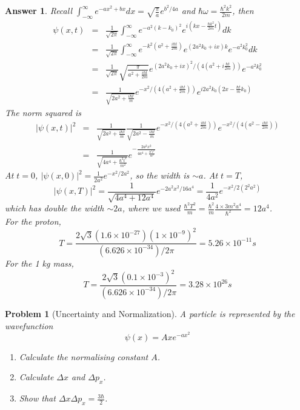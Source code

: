 \documentclass[a4paper]{article}
\newtheorem{ans}{Answer}[section]
\theoremstyle{new}
\newtheorem{qns}{Problem}[section]
\begin{document}
\begin{ans}
Recall $\int_{-\infty}^\infty e^{-ax^2+bx}dx=\sqrt{\frac{\pi}{a}}e^{b^2/4a}$ and $\hbar\omega=\frac{\hbar^2k^2}{2m}$, then
\begin{eqnarray}
\psi(x,t)&=&\frac{1}{\sqrt{2\pi}}\int_{-\infty}^\infty e^{-a^2(k-k_0)^2}e^{i(kx-\frac{\hbar k^2}{2m}t)}dk\nonumber\\&=&\frac{1}{\sqrt{2\pi}}\int_{-\infty}^\infty e^{-k^2(a^2+\frac{i\hbar t}{2m})}e^{(2a^2k_0+ix)k}e^{-a^2k_0^2}dk\nonumber\\&=&\frac{1}{\sqrt{2\pi}}\sqrt{\frac{\pi}{a^2+\frac{i\hbar t}{2m}}}e^{(2a^2k_0+ix)^2/(4(a^2+i\frac{\hbar t}{2m}))}e^{-a^2k_0^2}\nonumber\\&=&\frac{1}{\sqrt{2a^2+\frac{i\hbar t}{m}}}e^{-x^2/(4(a^2+\frac{i\hbar t}{2m}))}e^{i2a^2k_0(2x-\frac{\hbar t}{m}k_0)}\nonumber
\end{eqnarray}
The norm squared is
\begin{eqnarray}
|\psi(x,t)|^2&=&\frac{1}{\sqrt{2a^2+\frac{i\hbar t}{m}}}\frac{1}{\sqrt{2a^2-\frac{i\hbar t}{m}}}e^{-x^2/(4(a^2+\frac{i\hbar t}{2m}))}e^{-x^2/(4(a^2-\frac{i\hbar t}{2m}))}\nonumber\\&=&\frac{1}{\sqrt{4a^4+\frac{\hbar^2t^2}{m^2}}}e^{-\frac{2a^2x^2}{4a^4+\frac{\hbar^2t^2}{m^2}}}\nonumber
\end{eqnarray}
At $t=0$, $|\psi(x,0)|^2=\frac{1}{2a^2}e^{-x^2/2a^2}$, so the width is $\sim a$. At $t=T$,
$$|\psi(x,T)|^2=\frac{1}{\sqrt{4a^4+12a^4}}e^{-2a^2x^2/16a^4}=\frac{1}{4a^2}e^{-x^2/2(2^2a^2)}$$
which has double the width $\sim 2a$, where we used  $\frac{\hbar^2T^2}{m}=\frac{\hbar^2}{m}\frac{4\times 3m^2a^4}{\hbar^2}=12 a^4$.\\[5pt]
For the proton,
$$T=\frac{2\sqrt{3}(1.6\times10^{-27})(1\times10^{-9})^2}{(6.626\times10^{-34})/2\pi}=5.26\times10^{-11}s$$
For the 1 kg mass,
$$T=\frac{2\sqrt{3}(0.1\times10^{-3})^2}{(6.626\times10^{-34})/2\pi}=3.28\times10^{26}s$$
\end{ans}
\newpage
\begin{qns}[Uncertainty and Normalization]
A particle is represented by the wavefunction
$$\psi(x)=Axe^{-ax^2}$$
\begin{enumerate}[label=(\alph*)]
    \item Calculate the normalising constant $A$.
    \item Calculate $\Delta x$ and $\Delta p_x$.
    \item Show that $\Delta x\Delta p_x=\frac{3\hbar}{2}$.
\end{enumerate}
\end{qns}
\end{document}
